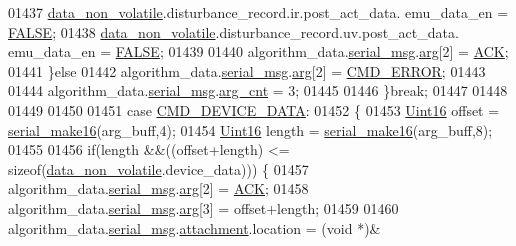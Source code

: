 \begin{DoxyCode}
{{{{{01437                           \hyperlink{a00060_a76ac5f917f5308dcd83de0d7c94559fb}{data\_non\_volatile}.disturbance\_record.ir.post\_act\_data.
      emu\_data\_en       = \hyperlink{a00040_aa93f0eb578d23995850d61f7d61c55c1}{FALSE};
01438                           \hyperlink{a00060_a76ac5f917f5308dcd83de0d7c94559fb}{data\_non\_volatile}.disturbance\_record.uv.post\_act\_data.
      emu\_data\_en       = \hyperlink{a00040_aa93f0eb578d23995850d61f7d61c55c1}{FALSE};
01439                              
01440                           algorithm\_data.\hyperlink{a00016_afcf5f557aea688aad985eec15269c1da}{serial\_msg}.\hyperlink{a00031_af7d6f762438c80072bd9dc0e4dd4ae1e}{arg}[2] = \hyperlink{a00021_a6f6489887e08bff4887d0bc5dcf214d8}{ACK};
01441                          \}\textcolor{keywordflow}{else}
01442                              algorithm\_data.\hyperlink{a00016_afcf5f557aea688aad985eec15269c1da}{serial\_msg}.\hyperlink{a00031_af7d6f762438c80072bd9dc0e4dd4ae1e}{arg}[2] = 
      \hyperlink{a00021_a1764a522e9c1a59a59be8757c69fa494}{CMD\_ERROR};
01443 
01444                              algorithm\_data.\hyperlink{a00016_afcf5f557aea688aad985eec15269c1da}{serial\_msg}.\hyperlink{a00031_a7b79f40e2eeec288091afd340bf8f591}{arg\_cnt} = 3;
01445 
01446                 \}\textcolor{keywordflow}{break};
01447 
01448 
01449 
01450 
01451                  \textcolor{keywordflow}{case}  \hyperlink{a00021_a4412fcb90fb9171d432a624428881e70}{CMD\_DEVICE\_DATA}:
01452                 \{
01453                     \hyperlink{a00072_a59a9f6be4562c327cbfb4f7e8e18f08b}{Uint16} offset = \hyperlink{a00031_abc17de32f14103a5be219df0d4ad9176}{serial\_make16}(arg\_buff,4);
01454                     \hyperlink{a00072_a59a9f6be4562c327cbfb4f7e8e18f08b}{Uint16} length = \hyperlink{a00031_abc17de32f14103a5be219df0d4ad9176}{serial\_make16}(arg\_buff,8);
01455                    
01456                    \textcolor{keywordflow}{if}(length &&((offset+length) <= \textcolor{keyword}{sizeof}(\hyperlink{a00060_a76ac5f917f5308dcd83de0d7c94559fb}{data\_non\_volatile}.device\_data)))
      \{
01457                        algorithm\_data.\hyperlink{a00016_afcf5f557aea688aad985eec15269c1da}{serial\_msg}.\hyperlink{a00031_af7d6f762438c80072bd9dc0e4dd4ae1e}{arg}[2]                 = 
      \hyperlink{a00021_a6f6489887e08bff4887d0bc5dcf214d8}{ACK};
01458                        algorithm\_data.\hyperlink{a00016_afcf5f557aea688aad985eec15269c1da}{serial\_msg}.\hyperlink{a00031_af7d6f762438c80072bd9dc0e4dd4ae1e}{arg}[3]                 = offset+length;
01459 
01460                        algorithm\_data.\hyperlink{a00016_afcf5f557aea688aad985eec15269c1da}{serial\_msg}.\hyperlink{a00031_a040f6d5d58d18d8aeaf447eda7f50172}{attachment}.location    = (\textcolor{keywordtype}{void} *)&
}}}}}
\end{DoxyCode}
